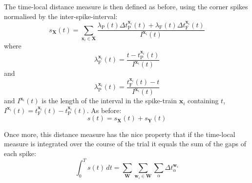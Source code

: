 The time-local distance measure is then defined as before, using the corner spikes normalised by the inter-spike-interval:
\begin{equation}
s_{\mathbf{X}}(t) = \sum_{\mathbf{x}_i \in \mathbf{X}} \frac{\lambda_{\mathrm{P}}(t)\Delta t_{\mathrm{P}}^{\mathbf{x}_i} (t) + \lambda_{\mathrm{F}}(t)\Delta t_{\mathrm{F}}^{\mathbf{x}_i}(t) }{I^{\mathbf{x}_i}(t) }%
\end{equation}
where 
\begin{equation}
\lambda_{\mathrm{F}}^{\mathbf{x}_i}(t) =\frac{ t-t_{\mathrm{P}}^{\mathbf{x}_i}(t)}{I^{\mathbf{x}_i}(t)}%
\end{equation}
and
\begin{equation}
 \lambda_{\mathrm{P}}^{\mathbf{x}_i}(t) =\frac{ t_{\mathrm{F}}^{\mathbf{x}_i}(t) - t}{I^{\mathbf{x}_i}(t)}%
\end{equation}
and $I^{\mathbf{x}_i}(t)$ is the length of the interval in the spike-train $\mathbf{x}_i$ containing $t$, $I^{\mathbf{x}_i}(t) = t_{\mathrm{F}}^{\mathbf{x}_i}(t) - t_{\mathrm{P}}^{\mathbf{x}_i}(t)$.
 As before:
\begin{equation}
s(t) = s_{\mathbf{X}}(t) + s_{\mathbf{Y}}(t)
\end{equation}

Once more, this distance measure has the nice property that if the time-local measure is integrated over the course of the trial it equals the sum of the gaps of each spike:
\begin{equation}
\int_0^T s(t)\,dt = \sum_{\mathbf{W}} \sum_{\mathbf{w}_i \in \mathbf{W}} \sum_{\alpha} \Delta t_{\alpha}^{\mathbf{w}_i}
\end{equation}
\bigskip


\begin{figure}

\end{figure}

\begin{figure}

\end{figure}
%
%

